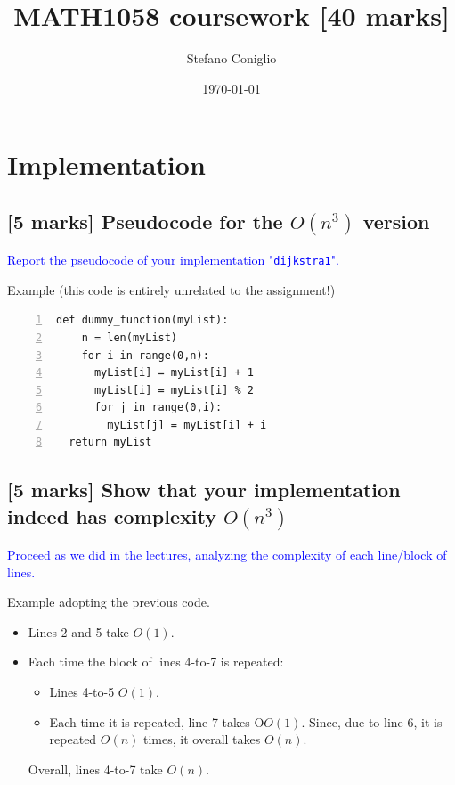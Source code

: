 \documentclass[a4paper]{article}
\title{MATH1058 coursework [40 marks]}
\author{Stefano Coniglio}
\date{\today}
\numberwithin{equation}{section} %
\begin{document}
\maketitle




\section{Implementation}

\subsection{[5 marks] Pseudocode for the $O(n^3)$ version}

\textcolor{blue}{
  Report the pseudocode of your implementation "{\tt dijkstra1}".
}


Example (this code is entirely unrelated to the assignment!)

\begin{Verbatim}[numbers=left]
  def dummy_function(myList):
    n = len(myList)
    for i in range(0,n):
      myList[i] = myList[i] + 1
      myList[i] = myList[i] % 2
      for j in range(0,i):
        myList[j] = myList[i] + i
  return myList
\end{Verbatim}
  


\subsection{[5 marks] Show that your implementation indeed has complexity $O(n^3)$}

\textcolor{blue}{
  Proceed as we did in the lectures, analyzing the complexity of each line/block of lines.
}

Example adopting the previous code.

\begin{itemize}
  \item Lines 2 and 5 take $O(1)$.
  \item Each time the block of lines 4-to-7 is repeated:
  \begin{itemize}
    \item Lines 4-to-5  $O(1)$.
    \item Each time it is repeated, line 7 takes O$O(1)$. Since, due to line 6, it is repeated $O(n)$ times, it overall takes $O(n)$.
  \end{itemize}
  Overall, lines 4-to-7 take $O(n)$.
\end{itemize}
\end{document}

